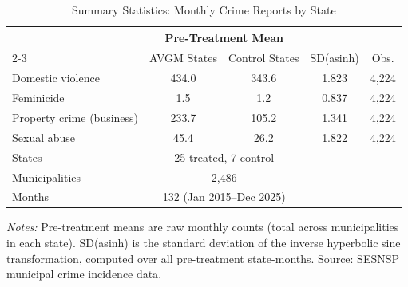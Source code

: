 \begin{table}[!t]
\centering
\caption{Summary Statistics: Monthly Crime Reports by State}
\label{tab:summary}
\begin{threeparttable}
\begin{tabular}{lcccc}
\hline\hline
 & \multicolumn{2}{c}{Pre-Treatment Mean} & & \\
\cline{2-3}
 & AVGM States & Control States & SD(asinh) & Obs. \\
\hline
Domestic violence & 434.0 & 343.6 & 1.823 & 4,224 \\
Feminicide & 1.5 & 1.2 & 0.837 & 4,224 \\
Property crime (business) & 233.7 & 105.2 & 1.341 & 4,224 \\
Sexual abuse & 45.4 & 26.2 & 1.822 & 4,224 \\
\hline
States & \multicolumn{2}{c}{25 treated, 7 control} & & \\
Municipalities & \multicolumn{2}{c}{2,486} & & \\
Months & \multicolumn{2}{c}{132 (Jan 2015--Dec 2025)} & & \\
\hline\hline
\end{tabular}
\begin{tablenotes}
\item \textit{Notes:} Pre-treatment means are raw monthly counts (total across municipalities in each state). SD(asinh) is the standard deviation of the inverse hyperbolic sine transformation, computed over all pre-treatment state-months. Source: SESNSP municipal crime incidence data.
\end{tablenotes}
\end{threeparttable}
\end{table}

